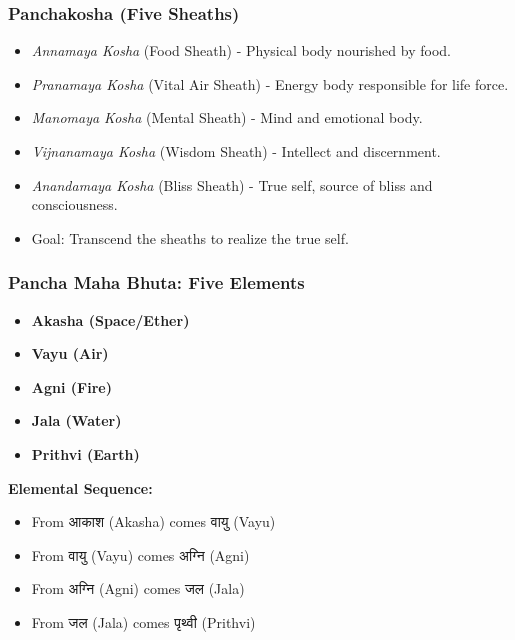 \begin{frame}[fragile]\frametitle{Panchakosha (Five Sheaths)}

      \begin{itemize}
		\item \textit{Annamaya Kosha} (Food Sheath) - Physical body nourished by food.
		\item \textit{Pranamaya Kosha} (Vital Air Sheath) - Energy body responsible for life force.
		\item \textit{Manomaya Kosha} (Mental Sheath) - Mind and emotional body.
		\item \textit{Vijnanamaya Kosha} (Wisdom Sheath) - Intellect and discernment.
		\item \textit{Anandamaya Kosha} (Bliss Sheath) - True self, source of bliss and consciousness.
		\item Goal: Transcend the sheaths to realize the true self.
	  \end{itemize}

\end{frame}

\begin{frame}[fragile]\frametitle{Pancha Maha Bhuta: Five Elements}


    \begin{itemize}
        \item \textbf{Akasha (Space/Ether)}
        \item \textbf{Vayu (Air)}
        \item \textbf{Agni (Fire)}
        \item \textbf{Jala (Water)}
        \item \textbf{Prithvi (Earth)}
    \end{itemize}
	
    \textbf{Elemental Sequence:}
	
    \begin{itemize}
        \item From आकाश (Akasha) comes वायु (Vayu)
        \item From वायु (Vayu) comes अग्नि (Agni)
        \item From अग्नि (Agni) comes जल (Jala)
        \item From जल (Jala) comes पृथ्वी (Prithvi)
    \end{itemize}
	
\end{frame}

